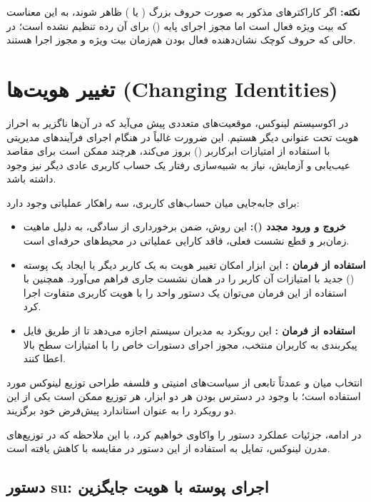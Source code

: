 \begin{note}
\textbf{نکته:} اگر کاراکترهای مذکور به صورت حروف بزرگ ( یا ) ظاهر شوند، به این معناست که بیت ویژه فعال است اما مجوز اجرای پایه () برای آن رده تنظیم نشده است؛ در حالی که حروف کوچک نشان‌دهنده فعال بودن هم‌زمان بیت ویژه و مجوز اجرا هستند.
\end{note}

\section{تغییر هویت‌ها (Changing Identities)}

در اکوسیستم لینوکس، موقعیت‌های متعددی پیش می‌آید که در آن‌ها ناگزیر به احراز هویت تحت عنوانی دیگر هستیم. این ضرورت غالباً در هنگام اجرای فرآیندهای مدیریتی با استفاده از امتیازات ابرکاربر () بروز می‌کند، هرچند ممکن است برای مقاصد عیب‌یابی و آزمایش، نیاز به شبیه‌سازی رفتار یک حساب کاربری عادی دیگر نیز وجود داشته باشد.

برای جابه‌جایی میان حساب‌های کاربری، سه راهکار عملیاتی وجود دارد:

\begin{itemize}
  \item \textbf{خروج و ورود مجدد ():} این روش، ضمن برخورداری از سادگی، به دلیل ماهیت زمان‌بر و قطع نشست فعلی، فاقد کارایی عملیاتی در محیط‌های حرفه‌ای است.
  \item \textbf{استفاده از فرمان :} این ابزار امکان تغییر هویت به یک کاربر دیگر یا ایجاد یک پوسته () جدید با امتیازات آن کاربر را در همان نشست جاری فراهم می‌آورد. همچنین با استفاده از این فرمان می‌توان یک دستور واحد را با هویت کاربری متفاوت اجرا کرد.
  \item \textbf{استفاده از فرمان :} این رویکرد به مدیران سیستم اجازه می‌دهد تا از طریق فایل پیکربندی  به کاربران منتخب، مجوز اجرای دستورات خاص را با امتیازات سطح بالا اعطا کنند.
\end{itemize}

انتخاب میان  و  عمدتاً تابعی از سیاست‌های امنیتی و فلسفه طراحی توزیع لینوکس مورد استفاده است؛ با وجود در دسترس بودن هر دو ابزار، هر توزیع ممکن است یکی از این دو رویکرد را به عنوان استاندارد پیش‌فرض خود برگزیند.

در ادامه، جزئیات عملکرد دستور  را واکاوی خواهیم کرد، با این ملاحظه که در توزیع‌های مدرن لینوکس، تمایل به استفاده از این دستور در مقایسه با  کاهش یافته است.

\subsection{دستور su: اجرای پوسته با هویت جایگزین}


